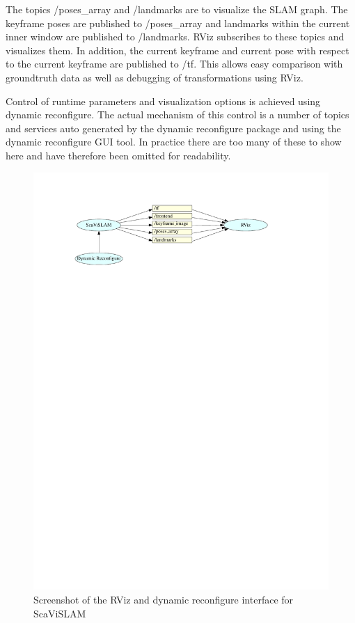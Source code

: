 The topics /poses\_array and /landmarks are to visualize the SLAM graph.  The keyframe poses are published to /poses\_array and landmarks within the current inner window are published to /landmarks.  RViz subscribes to these topics and visualizes them.  In addition, the current keyframe and current pose with respect to the current keyframe are published to /tf.  This allows easy comparison with groundtruth data as well as debugging of transformations using RViz.

Control of runtime parameters and visualization options is achieved using dynamic reconfigure.  The actual mechanism of this control is a number of topics and services auto generated by the dynamic reconfigure package and using the dynamic reconfigure GUI tool.  In practice there are too many of these to show here and have therefore been omitted for readability.

\begin{figure}[h]
  \centering
    \includegraphics[width=1.5\textwidth]{chapters/images/visualization_architecture}
  \caption{Screenshot of the RViz and dynamic reconfigure interface for ScaViSLAM}
  \label{fig:rviz}
\end{figure}